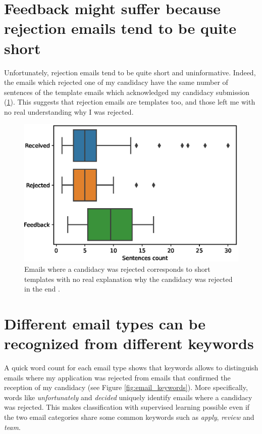 \documentclass[12pt]{article}
\begin{document}
\section{Feedback might suffer because rejection emails tend to be quite short}
Unfortunately, rejection emails tend to be quite short and uninformative. Indeed, the emails which rejected one of my candidacy have the same number of sentences of the template emails which acknowledged my candidacy submission (\ref{fig:email_lengths}). This suggests that rejection emails are templates too, and those left me with no real understanding why I was rejected.

\begin{figure}
\includegraphics[width = \linewidth]{message_length_distribution.eps}
\caption{Emails where a candidacy was rejected corresponds to short templates with no real explanation why the candidacy was rejected in the end . \label{fig:email_lengths}}
\end{figure}

\section{Different email types can be recognized from different keywords}
A quick word count for each email type shows that keywords allows to distinguish emails where my application was rejected  from emails that confirmed the reception of my candidacy (see Figure \ref{fig:email_keywords}). More specifically, words like \emph{unfortunately} and \emph{decided} uniquely identify emails where a candidacy was rejected. This makes classification with supervised learning possible even if the two email categories share some common keywords such as \emph{apply}, \emph{review} and \emph{team}.
\end{document}
